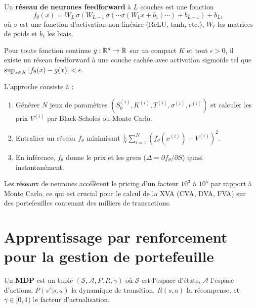 \begin{definition}
Un \textbf{r\'eseau de neurones feedforward} \`a $L$ couches est une fonction
\[
    f_\theta(x) = W_L\,\sigma(W_{L-1}\,\sigma(\cdots\sigma(W_1 x + b_1)\cdots) + b_{L-1}) + b_L,
\]
o\`u $\sigma$ est une fonction d'activation non lin\'eaire (ReLU, tanh, etc.),
$W_\ell$ les matrices de poids et $b_\ell$ les biais.
\end{definition}

\begin{theoreme}
Pour toute fonction continue $g : \mathbb{R}^d \to \mathbb{R}$ sur un compact $K$ et tout
$\epsilon > 0$, il existe un r\'eseau feedforward \`a une couche cach\'ee avec
activation sigmo\"ide tel que $\sup_{x \in K}\left| f_\theta(x) - g(x) \right| < \epsilon$.
\end{theoreme}

\begin{proposition}
L'approche consiste \`a :
\begin{enumerate}
    \item G\'en\'erer $N$ jeux de param\`etres $(S_0^{(i)}, K^{(i)}, T^{(i)},
    \sigma^{(i)}, r^{(i)})$ et calculer les prix $V^{(i)}$ par Black-Scholes
    ou Monte Carlo.
    \item Entra\^iner un r\'eseau $f_\theta$ minimisant
    $\frac{1}{N}\sum_{i=1}^N (f_\theta(x^{(i)}) - V^{(i)})^2$.
    \item En inf\'erence, $f_\theta$ donne le prix et les grecs
    ($\Delta = \partial f_\theta/\partial S$) quasi instantan\'ement.
\end{enumerate}
\end{proposition}

\begin{remarque}
Les r\'eseaux de neurones acc\'el\`erent le pricing d'un facteur $10^3$ \`a
$10^5$ par rapport \`a Monte Carlo, ce qui est crucial pour le calcul de la
XVA (CVA, DVA, FVA) sur des portefeuilles contenant des milliers de
transactions.
\end{remarque}

\section{Apprentissage par renforcement pour la gestion de portefeuille}

\begin{definition}
Un \textbf{MDP} est un tuple $(\mathcal{S}, \mathcal{A}, P, R, \gamma)$ o\`u
$\mathcal{S}$ est l'espace d'\'etats, $\mathcal{A}$ l'espace d'actions,
$P(s'|s, a)$ la dynamique de transition, $R(s, a)$ la r\'ecompense, et
$\gamma \in [0, 1)$ le facteur d'actualisation.
\end{definition}

